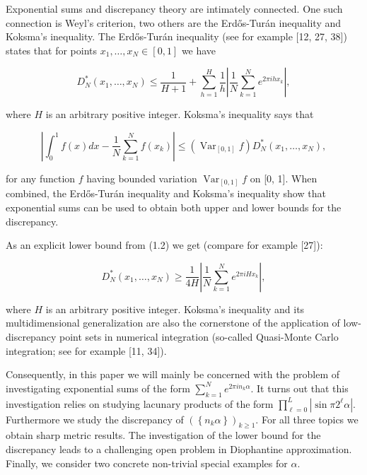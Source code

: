 \documentclass[10pt]{article}
\begin{document}
Exponential sums and discrepancy theory are intimately connected. One such connection is Weyl's criterion, two others are the Erdős-Turán inequality and Koksma's inequality. The Erdős-Turán inequality (see for example [12, 27, 38]) states that for points $x_{1}, \ldots, x_{N} \in[0,1]$ we have


\begin{equation*}
D_{N}^{*}\left(x_{1}, \ldots, x_{N}\right) \leqslant \frac{1}{H+1}+\sum_{h=1}^{H} \frac{1}{h}\left|\frac{1}{N} \sum_{k=1}^{N} e^{2 \pi i h x_{k}}\right|, \tag{1.1}
\end{equation*}


where $H$ is an arbitrary positive integer. Koksma's inequality says that


\begin{equation*}
\left|\int_{0}^{1} f(x) d x-\frac{1}{N} \sum_{k=1}^{N} f\left(x_{k}\right)\right| \leqslant\left(\operatorname{Var}_{[0,1]} f\right) D_{N}^{*}\left(x_{1}, \ldots, x_{N}\right), \tag{1.2}
\end{equation*}


for any function $f$ having bounded variation $\operatorname{Var}_{[0,1]} f$ on [0, 1]. When combined, the Erdős-Turán inequality and Koksma's inequality show that exponential sums can be used to obtain both upper and lower bounds for the discrepancy.

As an explicit lower bound from (1.2) we get (compare for example [27]):


\begin{equation*}
D_{N}^{*}\left(x_{1}, \ldots, x_{N}\right) \geqslant \frac{1}{4 H}\left|\frac{1}{N} \sum_{k=1}^{N} e^{2 \pi i H x_{k}}\right|, \tag{1.3}
\end{equation*}


where $H$ is an arbitrary positive integer. Koksma's inequality and its multidimensional generalization are also the cornerstone of the application of low-discrepancy point sets in numerical integration (so-called Quasi-Monte Carlo integration; see for example [11, 34]).

Consequently, in this paper we will mainly be concerned with the problem of investigating exponential sums of the form $\sum_{k=1}^{N} e^{2 \pi i n_{k} \alpha}$. It turns out that this investigation relies on studying lacunary products of the form $\prod_{\ell=0}^{L}\left|\sin \pi 2^{\ell} \alpha\right|$. Furthermore we study the discrepancy of $\left(\left\{n_{k} \alpha\right\}\right)_{k \geqslant 1}$. For all three topics we obtain sharp metric results. The investigation of the lower bound for the discrepancy leads to a challenging open problem in Diophantine approximation. Finally, we consider two concrete non-trivial special examples for $\alpha$.
\end{document}
